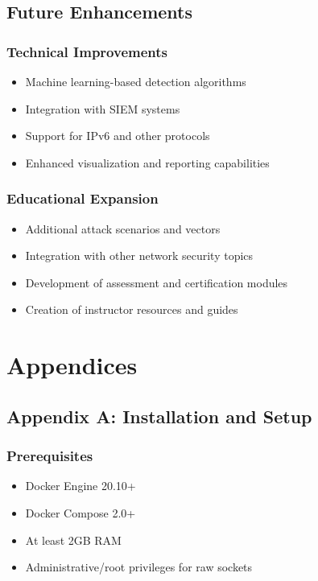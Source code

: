 \documentclass[12pt,a4paper]{article}
\begin{document}
\subsection{Future Enhancements}

\subsubsection{Technical Improvements}
\begin{itemize}
    \item Machine learning-based detection algorithms
    \item Integration with SIEM systems
    \item Support for IPv6 and other protocols
    \item Enhanced visualization and reporting capabilities
\end{itemize}

\subsubsection{Educational Expansion}
\begin{itemize}
    \item Additional attack scenarios and vectors
    \item Integration with other network security topics
    \item Development of assessment and certification modules
    \item Creation of instructor resources and guides
\end{itemize}

\section{Appendices}

\subsection{Appendix A: Installation and Setup}

\subsubsection{Prerequisites}
\begin{itemize}
    \item Docker Engine 20.10+
    \item Docker Compose 2.0+
    \item At least 2GB RAM
    \item Administrative/root privileges for raw sockets
\end{itemize}
\end{document}
